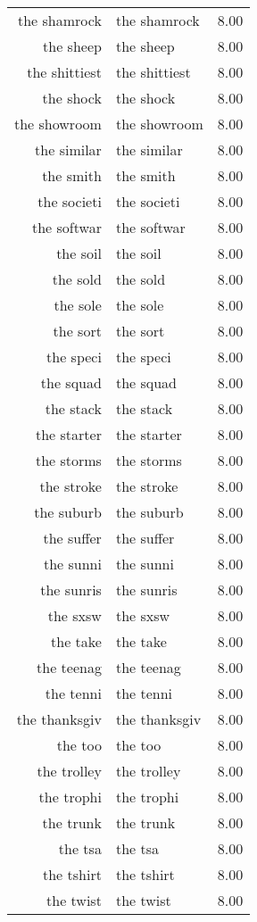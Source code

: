 \begin{table}[ht]
\begin{tabular}{rlr}
  the shamrock & the shamrock & 8.00 \\ 
  the sheep & the sheep & 8.00 \\ 
  the shittiest & the shittiest & 8.00 \\ 
  the shock & the shock & 8.00 \\ 
  the showroom & the showroom & 8.00 \\ 
  the similar & the similar & 8.00 \\ 
  the smith & the smith & 8.00 \\ 
  the societi & the societi & 8.00 \\ 
  the softwar & the softwar & 8.00 \\ 
  the soil & the soil & 8.00 \\ 
  the sold & the sold & 8.00 \\ 
  the sole & the sole & 8.00 \\ 
  the sort & the sort & 8.00 \\ 
  the speci & the speci & 8.00 \\ 
  the squad & the squad & 8.00 \\ 
  the stack & the stack & 8.00 \\ 
  the starter & the starter & 8.00 \\ 
  the storms & the storms & 8.00 \\ 
  the stroke & the stroke & 8.00 \\ 
  the suburb & the suburb & 8.00 \\ 
  the suffer & the suffer & 8.00 \\ 
  the sunni & the sunni & 8.00 \\ 
  the sunris & the sunris & 8.00 \\ 
  the sxsw & the sxsw & 8.00 \\ 
  the take & the take & 8.00 \\ 
  the teenag & the teenag & 8.00 \\ 
  the tenni & the tenni & 8.00 \\ 
  the thanksgiv & the thanksgiv & 8.00 \\ 
  the too & the too & 8.00 \\ 
  the trolley & the trolley & 8.00 \\ 
  the trophi & the trophi & 8.00 \\ 
  the trunk & the trunk & 8.00 \\ 
  the tsa & the tsa & 8.00 \\ 
  the tshirt & the tshirt & 8.00 \\ 
  the twist & the twist & 8.00 \\ 

\end{tabular}
\end{table}
